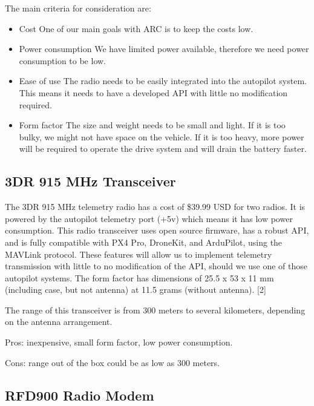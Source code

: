 \documentclass[compsoc,draftclsnofoot,onecolumn,10pt]{IEEEtran}
\begin{document}
The main criteria for consideration are:
\begin{itemize}

	\item Cost
		\subitem One of our main goals with ARC is to keep the costs low.
	\item Power consumption
		\subitem We have limited power available, therefore we need power
		consumption to be low.

	\item Ease of use
		\subitem The radio needs to be easily integrated into the autopilot
		system. This means it needs to have a developed API with little no
		modification required.

	\item Form factor
		\subitem The size and weight needs to be small and light. If it is too
		bulky, we might not have space on the vehicle. If it is too heavy, more
		power will be required to operate the drive system and will drain the
		battery faster.

\end{itemize}


\subsection{3DR 915 MHz Transceiver}

The 3DR 915 MHz telemetry radio has a cost of \$39.99 USD for two radios. It is
powered by the autopilot telemetry port (+5v) which means it has low power
consumption. This radio transceiver uses open source firmware, has a robust API,
and is fully compatible with PX4 Pro, DroneKit, and ArduPilot, using the MAVLink
protocol. These features will allow us to implement telemetry transmission with
little to no modification of the API, should we use one of those autopilot
systems.  The form factor has dimensions of 25.5 x 53 x 11 mm (including case,
but not antenna) at 11.5 grams (without antenna). [2]

The range of this transceiver is from 300 meters to several kilometers,
depending on the antenna arrangement.

Pros: inexpensive, small form factor, low power consumption.

Cons: range out of the box could be as low as 300 meters.


\subsection{RFD900 Radio Modem}
\end{document}
